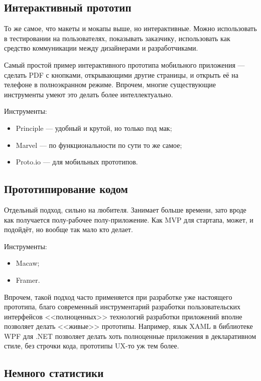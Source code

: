 \documentclass{../../text-style}
\begin{document}
\subsection{Интерактивный прототип}

То же самое, что макеты и мокапы выше, но интерактивные. Можно использовать в тестировании на пользователях, показывать заказчику, использовать как средство коммуникации между дизайнерами и разработчиками.

Самый простой пример интерактивного прототипа мобильного приложения --- сделать PDF с кнопками, открывающими другие страницы, и открыть её на телефоне в полноэкранном режиме. Впрочем, многие существующие инструменты умеют это делать более интеллектуально. 

Инструменты:

\begin{itemize}
    \item Principle --- удобный и крутой, но только под мак;
    \item Marvel --- по функциональности по сути то же самое;
    \item Proto.io --- для мобильных прототипов.
\end{itemize}

\subsection{Прототипирование кодом}

Отдельный подход, сильно на любителя. Занимает больше времени, зато вроде как получается полу-рабочее полу-приложение. Как MVP для стартапа, может, и подойдёт, но вообще так мало кто делает. 

Инструменты:

\begin{itemize}
    \item Macaw;
    \item Framer.
\end{itemize}

Впрочем, такой подход часто применяется при разработке уже настоящего прототипа, благо современный инструментарий разработки пользовательских интерфейсов <<полноценных>> технологий разработки приложений вполне позволяет делать <<живые>> прототипы. Например, язык XAML в библиотеке WPF для .NET позволяет делать хоть полноценные приложения в декларативном стиле, без строчки кода, прототипы UX-то уж тем более.

\subsection{Немного статистики}
\end{document}
